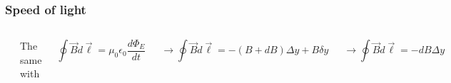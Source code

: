 \documentclass[]{beamer}
\begin{document}
\begin{frame}

\frametitle{Speed of light}



   \begin{columns}[c]
   \column{2in}  %
  
 \begin{center}
  \includegraphics[height=1.4in]{images5/EMwave3.jpg}
\end{center}


   \column{2.5in}
\pause

The same with 

\begin{equation*}
\oint \vec{B}d\vec{\ell}=\mu_0\epsilon_0\frac{d\Phi_E}{dt}
\end{equation*}
\pause

\begin{equation*}
\rightarrow   \oint \vec{B}d\vec{\ell}=-(B+dB)\Delta y + B\delta y
\end{equation*}
\pause

\begin{equation*}
\rightarrow   \oint \vec{B}d\vec{\ell}=-dB\Delta y
\end{equation*}
\pause



   \end{columns}




  \end{frame}







\end{document}

